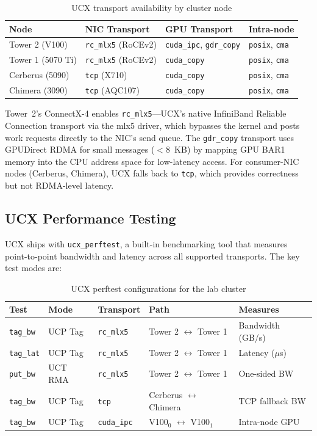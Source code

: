 \documentclass[11pt,letterpaper]{article}
\begin{document}
\begin{table}[htbp]
\centering
\caption{UCX transport availability by cluster node}
\label{tab:ucx-transports}
\begin{tabular}{@{}llll@{}}
\toprule
\textbf{Node} & \textbf{NIC Transport} & \textbf{GPU Transport} & \textbf{Intra-node} \\
\midrule
Tower 2 (V100) & \texttt{rc\_mlx5} (RoCEv2) & \texttt{cuda\_ipc}, \texttt{gdr\_copy} & \texttt{posix}, \texttt{cma} \\
Tower 1 (5070 Ti) & \texttt{rc\_mlx5} (RoCEv2) & \texttt{cuda\_copy} & \texttt{posix}, \texttt{cma} \\
Cerberus (5090) & \texttt{tcp} (X710) & \texttt{cuda\_copy} & \texttt{posix}, \texttt{cma} \\
Chimera (3090) & \texttt{tcp} (AQC107) & \texttt{cuda\_copy} & \texttt{posix}, \texttt{cma} \\
\bottomrule
\end{tabular}
\end{table}

Tower~2's ConnectX-4 enables \texttt{rc\_mlx5}---UCX's native InfiniBand Reliable Connection transport via the mlx5 driver, which bypasses the kernel and posts work requests directly to the NIC's send queue. The \texttt{gdr\_copy} transport uses GPUDirect RDMA for small messages ($<$8~KB) by mapping GPU BAR1 memory into the CPU address space for low-latency access. For consumer-NIC nodes (Cerberus, Chimera), UCX falls back to \texttt{tcp}, which provides correctness but not RDMA-level latency.

\subsection{UCX Performance Testing}

UCX ships with \texttt{ucx\_perftest}, a built-in benchmarking tool that measures point-to-point bandwidth and latency across all supported transports. The key test modes are:

\begin{table}[htbp]
\centering
\caption{UCX perftest configurations for the lab cluster}
\label{tab:ucx-perftests}
\begin{tabular}{@{}lllll@{}}
\toprule
\textbf{Test} & \textbf{Mode} & \textbf{Transport} & \textbf{Path} & \textbf{Measures} \\
\midrule
\texttt{tag\_bw} & UCP Tag & \texttt{rc\_mlx5} & Tower 2 $\leftrightarrow$ Tower 1 & Bandwidth (GB/s) \\
\texttt{tag\_lat} & UCP Tag & \texttt{rc\_mlx5} & Tower 2 $\leftrightarrow$ Tower 1 & Latency ($\mu$s) \\
\texttt{put\_bw} & UCT RMA & \texttt{rc\_mlx5} & Tower 2 $\leftrightarrow$ Tower 1 & One-sided BW \\
\texttt{tag\_bw} & UCP Tag & \texttt{tcp} & Cerberus $\leftrightarrow$ Chimera & TCP fallback BW \\
\texttt{tag\_bw} & UCP Tag & \texttt{cuda\_ipc} & V100$_0$ $\leftrightarrow$ V100$_1$ & Intra-node GPU \\
\bottomrule
\end{tabular}
\end{table}
\end{document}
